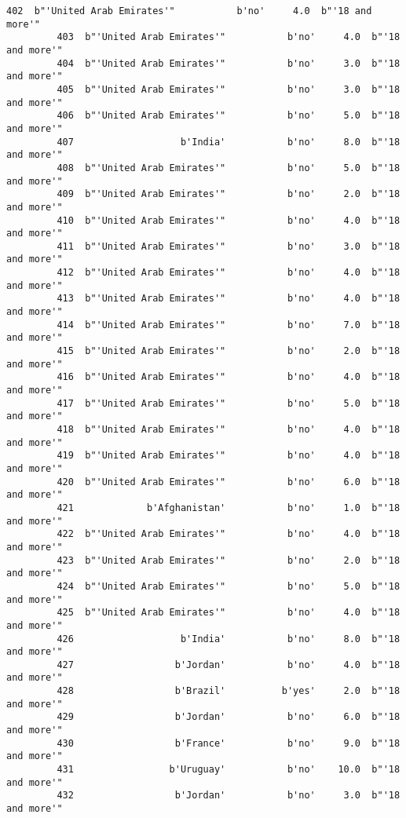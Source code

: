 \documentclass[11pt]{article}
\begin{document}
\begin{Verbatim}[commandchars=\\\{\}]
         402  b"'United Arab Emirates'"           b'no'     4.0  b"'18 and more'"   
         403  b"'United Arab Emirates'"           b'no'     4.0  b"'18 and more'"   
         404  b"'United Arab Emirates'"           b'no'     3.0  b"'18 and more'"   
         405  b"'United Arab Emirates'"           b'no'     3.0  b"'18 and more'"   
         406  b"'United Arab Emirates'"           b'no'     5.0  b"'18 and more'"   
         407                   b'India'           b'no'     8.0  b"'18 and more'"   
         408  b"'United Arab Emirates'"           b'no'     5.0  b"'18 and more'"   
         409  b"'United Arab Emirates'"           b'no'     2.0  b"'18 and more'"   
         410  b"'United Arab Emirates'"           b'no'     4.0  b"'18 and more'"   
         411  b"'United Arab Emirates'"           b'no'     3.0  b"'18 and more'"   
         412  b"'United Arab Emirates'"           b'no'     4.0  b"'18 and more'"   
         413  b"'United Arab Emirates'"           b'no'     4.0  b"'18 and more'"   
         414  b"'United Arab Emirates'"           b'no'     7.0  b"'18 and more'"   
         415  b"'United Arab Emirates'"           b'no'     2.0  b"'18 and more'"   
         416  b"'United Arab Emirates'"           b'no'     4.0  b"'18 and more'"   
         417  b"'United Arab Emirates'"           b'no'     5.0  b"'18 and more'"   
         418  b"'United Arab Emirates'"           b'no'     4.0  b"'18 and more'"   
         419  b"'United Arab Emirates'"           b'no'     4.0  b"'18 and more'"   
         420  b"'United Arab Emirates'"           b'no'     6.0  b"'18 and more'"   
         421             b'Afghanistan'           b'no'     1.0  b"'18 and more'"   
         422  b"'United Arab Emirates'"           b'no'     4.0  b"'18 and more'"   
         423  b"'United Arab Emirates'"           b'no'     2.0  b"'18 and more'"   
         424  b"'United Arab Emirates'"           b'no'     5.0  b"'18 and more'"   
         425  b"'United Arab Emirates'"           b'no'     4.0  b"'18 and more'"   
         426                   b'India'           b'no'     8.0  b"'18 and more'"   
         427                  b'Jordan'           b'no'     4.0  b"'18 and more'"   
         428                  b'Brazil'          b'yes'     2.0  b"'18 and more'"   
         429                  b'Jordan'           b'no'     6.0  b"'18 and more'"   
         430                  b'France'           b'no'     9.0  b"'18 and more'"   
         431                 b'Uruguay'           b'no'    10.0  b"'18 and more'"   
         432                  b'Jordan'           b'no'     3.0  b"'18 and more'"   

\end{Verbatim}
\end{document}
